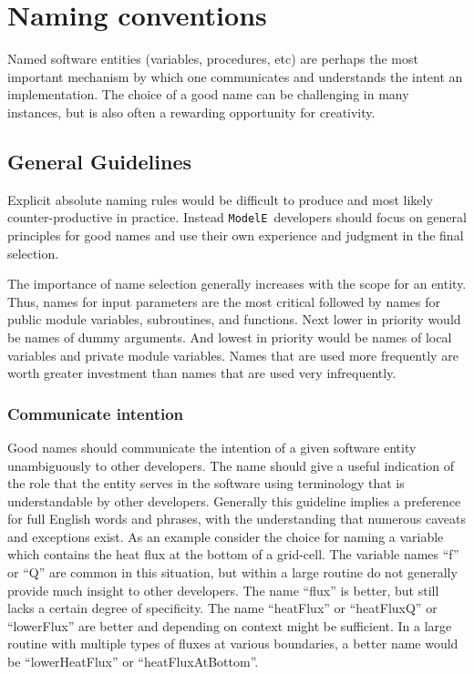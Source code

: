 \documentclass{article}
\newcommand{\ModelE}{{\tt ModelE}}
\begin{document}
\section {Naming conventions}

Named software entities (variables, procedures, etc) are perhaps the
most important mechanism by which one communicates and understands the
intent an implementation.  The choice of a good name can be
challenging in many instances, but is also often a rewarding
opportunity for creativity.

\subsection {General Guidelines}

Explicit absolute naming rules would be difficult to produce and most
likely counter-productive in practice.  Instead \ModelE~developers
should focus on general principles for good names and use their own
experience and judgment in the final selection.   

The importance of name selection generally increases with the scope
for an entity.  Thus, names for input parameters are the most critical
followed by names for public module variables, subroutines, and
functions.  Next lower in priority would be names of dummy
arguments. And lowest in priority would be names of local variables
and private module variables. Names that are used more frequently are
worth greater investment than names that are used very infrequently.

\subsubsection {Communicate intention}
Good names should communicate the intention of a given software entity
unambiguously to other developers.  The name should give a useful
indication of the role that the entity serves in the software using
terminology that is understandable by other developers.  Generally
this guideline implies a preference for full English words and
phrases, with the understanding that numerous caveats and exceptions
exist.  As an example consider the choice for naming a variable which
contains the heat flux at the bottom of a grid-cell.  The variable
names ``f'' or ``Q'' are common in this situation, but within a large
routine do not generally provide much insight to other developers. The
name ``flux'' is better, but still lacks a certain degree of
specificity.  The name ``heatFlux'' or ``heatFluxQ'' or ``lowerFlux''
are better and depending on context might be sufficient.  In a large
routine with multiple types of fluxes at various boundaries, a better
name would be ``lowerHeatFlux'' or ``heatFluxAtBottom''.   
\end{document}
